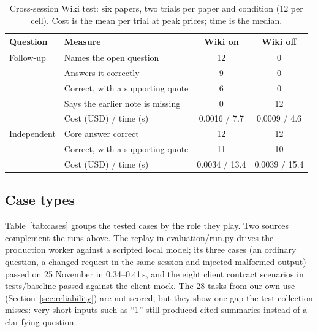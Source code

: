 \documentclass{article}
\newcommand{\code}[1]{{\ttfamily\small\hyphenchar\font=-1\relax #1}}
\begin{document}
\begin{table}[H]
  \caption{Cross-session Wiki test: six papers, two trials per paper and condition (12 per cell).
  Cost is the mean per trial at peak prices; time is the median.}
  \label{tab:wiki}
  \small\centering
  \begin{tabular}{@{}llcc@{}}\toprule
    Question & Measure & Wiki on & Wiki off \\ \midrule
    Follow-up & Names the open question & 12 & 0 \\
     & Answers it correctly & 9 & 0 \\
     & Correct, with a supporting quote & 6 & 0 \\
     & Says the earlier note is missing & 0 & 12 \\
     & Cost (USD) / time (s) & 0.0016 / 7.7 & 0.0009 / 4.6 \\ \midrule
    Independent & Core answer correct & 12 & 12 \\
     & Correct, with a supporting quote & 11 & 10 \\
     & Cost (USD) / time (s) & 0.0034 / 13.4 & 0.0039 / 15.4 \\
    \bottomrule
  \end{tabular}
\end{table}

\subsection{Case types}
\label{sec:eval-cases}
Table~\ref{tab:cases} groups the tested cases by the role they play. Two sources complement the runs
above. The replay in \code{evaluation/run.py} drives the production worker against a scripted local
model; its three cases (an ordinary question, a changed request in the same session and injected
malformed output) passed on 25 November in 0.34--0.41\,s, and the eight client contract scenarios in
\code{tests/baseline} passed against the client mock. The 28 tasks from our own use
(Section~\ref{sec:reliability}) are not scored, but they show one gap the test collection misses:
very short inputs such as ``1'' still produced cited summaries instead of a clarifying question.
\end{document}
